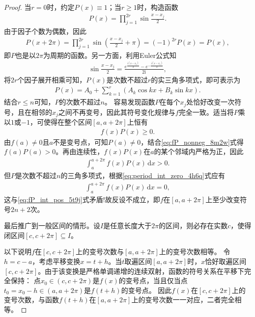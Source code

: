 \documentclass[../../main.tex]{subfiles}%
\begin{document}
\begin{proof}
当$r=0$时，约定$P(x)\equiv 1$；当$r\geqslant 1$时，构造函数
\begin{align*}
P(x) = \prod\limits_{j=1}^{2r} \sin \frac{x-x_j}{2}.
\end{align*}
由于因子个数为偶数，因此
\begin{align*}
P(x+2\pi) = \prod\limits_{j=1}^{2r} \sin\left( \frac{x-x_j}{2} + \pi \right) = (-1)^{2r} P(x) = P(x),
\end{align*}
即$P$也是以$2\pi$为周期的函数。另一方面，利用Euler公式知
\begin{align*}
\sin \frac{x-x_j}{2}=\frac{e^{\frac{\mathrm{i}\left( x-x_j \right)}{2}}-e^{-\frac{\mathrm{i}\left( x-x_j \right)}{2}}}{2\mathrm{i}},
\end{align*}
将$2r$个因子展开相乘可知，$P(x)$是次数不超过$r$的实三角多项式，即可表示为
\begin{align*}
P(x) = A_0 + \sum\limits_{k=1}^{r} \left( A_k \cos kx + B_k \sin kx \right).
\end{align*}
结合$r \leqslant n$可知，$P$的次数不超过$n$。
容易发现函数$P$在每个$x_j$处恰好改变一次符号，且在相邻的$x_j$之间不再变号，因此其符号变化规律与$f$完全一致。适当将$P$乘以$1$或$-1$，可使得在整个区间$[a,a+2\pi]$上恒有
\begin{align}
f(x) P(x) \geqslant 0.
\label{eq:fP_nonneg_8m2w}
\end{align}
由$f(a)\neq 0$且$a$不是变号点，可知$P(a)\neq 0$，结合\eqref{eq:fP_nonneg_8m2w}式得$f(a)P(a)>0$。再由连续性，$f(x)P(x)$在$a$的某个邻域内严格为正，因此
\begin{align}
\int_{a}^{a+2\pi} f(x) P(x)\,\mathrm{d}x > 0.
\label{eq:fP_int_pos_5t9j}
\end{align}
但$P$是次数不超过$n$的三角多项式，根据\eqref{eq:period_int_zero_4h6q}式应有
\begin{align*}
\int_{a}^{a+2\pi} f(x) P(x)\,\mathrm{d}x = 0,
\end{align*}
这与\eqref{eq:fP_int_pos_5t9j}式矛盾!故反设不成立，即$f$在$[a,a+2\pi]$上至少改变符号$2n+2$次。

最后推广到一般区间的情形。设$I$是任意长度大于$2\pi$的区间，则必存在实数$c$，使得闭区间$[c, c+2\pi] \subseteq I$。

以下说明$f$在$[c, c+2\pi]$上的变号次数与$[a, a+2\pi]$上的变号次数相等。
令$h = c - a$，考虑平移变换$x = t + h$。当$t$取遍区间$[a, a+2\pi]$时，$x$恰好取遍区间$[c, c+2\pi]$。由于该变换是严格单调递增的连续双射，函数的符号关系在平移下完全保持：
点$x_0 \in (c, c+2\pi)$是$f(x)$的变号点，当且仅当点$t_0 = x_0 - h \in (a, a+2\pi)$是$f(t+h)$的变号点。
因此$f(x)$在$[c, c+2\pi]$上的变号次数，与函数$f(t+h)$在$[a, a+2\pi]$上的变号次数一一对应，二者完全相等。


\end{proof}
\end{document}
